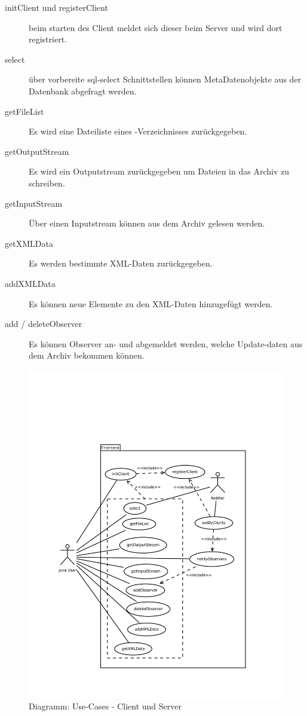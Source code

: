\begin{description}
	\item [initClient und registerClient]
		beim starten des Client meldet sich dieser beim Server und wird dort registriert.
	\item [select]
		über vorbereite sql-select Schnittstellen können MetaDatenobjekte aus der
		Datenbank abgefragt werden.
	\item [getFileList]
		Es wird eine Dateiliste eines \arc-Verzeichnisses zurückgegeben.
	\item [getOutputStream]
		Es wird ein Outputstream zurückgegeben um Dateien in das Archiv zu schreiben.
	\item [getInputStream]
		Über einen Inputstream können aus dem Archiv gelesen werden.
	\item [getXMLData]
		Es werden bestimmte XML-Daten zurückgegeben.
	\item [addXMLData]
		Es können neue Elemente zu den XML-Daten hinzugefügt werden.
	\item [add / deleteObserver]
		Es können Observer an- und abgemeldet werden, welche Update-daten aus dem
		Archiv bekommen können.
\end{description}
\begin{figure}[!h]
	\centering
	\label{design:dia:usecase}
	\includegraphics[height=0.9\textheight]{design/frontend/usecase.pdf}
	\caption{Diagramm: Use-Cases - Client und Server}
\end{figure}

